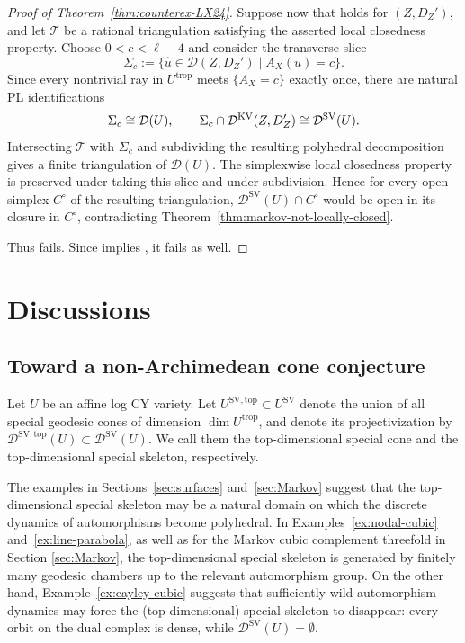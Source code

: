 \documentclass[reqno, 12pt]{amsart}
\theoremstyle{definition}
\newcommand{\cD}{\mathcal{D}}
\newcommand{\trop}{\mathrm{trop}}
\newcommand{\SV}{\mathrm{SV}}
\numberwithin{equation}{section}
\begin{document}
\begin{proof}[Proof of Theorem~\ref{thm:counterex-LX24}]
Suppose now that \cite[Conjecture~1.8(1)]{LX24} holds for $(Z,D_Z')$, and
let $\mathscr T$ be a rational triangulation satisfying the asserted
local closedness property. Choose
$0<c<\ell-4$
and consider the transverse slice
\[
\Sigma_c
:=
\{\widehat u\in\cD(Z,D_Z')\mid A_X(u)=c\}.
\]
Since every nontrivial ray in $U^{\trop}$ meets $\{A_X=c\}$ exactly once,
there are natural PL identifications
\[
\Sigma_c\cong\cD(U),
\qquad
\Sigma_c\cap\cD^{\rm KV}(Z,D_Z')
\cong\cD^{\SV}(U).
\]
Intersecting $\mathscr T$ with $\Sigma_c$ and subdividing the resulting
polyhedral decomposition gives a finite triangulation of $\cD(U)$. The
simplexwise local closedness property is preserved under taking this slice
and under subdivision. Hence for every open simplex $C^\circ$ of the
resulting triangulation, $\cD^{\SV}(U)\cap C^\circ$
would be open in its closure in $C^\circ$, contradicting
Theorem~\ref{thm:markov-not-locally-closed}.

Thus \cite[Conjecture~1.8(1)]{LX24} fails. Since
\cite[Conjecture~1.8(1')]{LX24} implies \cite[Conjecture~1.8(1)]{LX24},
it fails as well.
\end{proof}


\section{Discussions}\label{sec:discussions}

\subsection{Toward a non-Archimedean cone conjecture}

Let $U$ be an affine log CY variety. Let $U^{\SV,\mathrm{top}}\subset U^{\SV}$ denote the union of all
special geodesic cones of dimension $\dim U^{\trop}$, and denote its projectivization by $\cD^{\SV, \mathrm{top}}(U)\subset \cD^{\SV}(U)$.
We call them the top-dimensional special cone and the top-dimensional
special skeleton, respectively.


The examples in Sections~\ref{sec:surfaces} and~\ref{sec:Markov} suggest that the top-dimensional special skeleton may be
a natural domain on which the discrete dynamics of automorphisms become
polyhedral. In Examples~\ref{ex:nodal-cubic} and~\ref{ex:line-parabola}, as well as for the Markov cubic
complement threefold in Section \ref{sec:Markov}, the top-dimensional special skeleton is generated by finitely many geodesic
chambers up to the relevant automorphism group. On the other hand, Example~\ref{ex:cayley-cubic} suggests that sufficiently
wild automorphism dynamics may force the (top-dimensional) special skeleton to disappear:  every orbit on the dual complex is dense,
while $\cD^{\SV}(U)=\emptyset$. 
\end{document}
